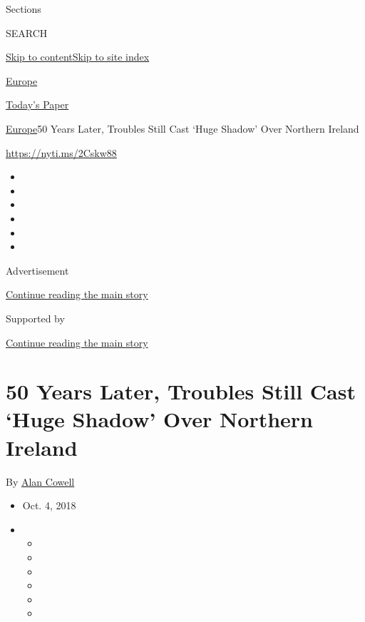 Sections

SEARCH

\protect\hyperlink{site-content}{Skip to
content}\protect\hyperlink{site-index}{Skip to site index}

\href{https://www.nytimes.com/section/world/europe}{Europe}

\href{https://myaccount.nytimes.com/auth/login?response_type=cookie\&client_id=vi}{}

\href{https://www.nytimes.com/section/todayspaper}{Today's Paper}

\href{/section/world/europe}{Europe}\textbar{}50 Years Later, Troubles
Still Cast `Huge Shadow' Over Northern Ireland

\url{https://nyti.ms/2Cskw88}

\begin{itemize}
\item
\item
\item
\item
\item
\item
\end{itemize}

Advertisement

\protect\hyperlink{after-top}{Continue reading the main story}

Supported by

\protect\hyperlink{after-sponsor}{Continue reading the main story}

\hypertarget{50-years-later-troubles-still-cast-huge-shadow-over-northern-ireland}{%
\section{50 Years Later, Troubles Still Cast `Huge Shadow' Over Northern
Ireland}\label{50-years-later-troubles-still-cast-huge-shadow-over-northern-ireland}}

By \href{https://www.nytimes.com/by/alan-cowell}{Alan Cowell}

\begin{itemize}
\item
  Oct. 4, 2018
\item
  \begin{itemize}
  \item
  \item
  \item
  \item
  \item
  \item
  \end{itemize}
\end{itemize}

